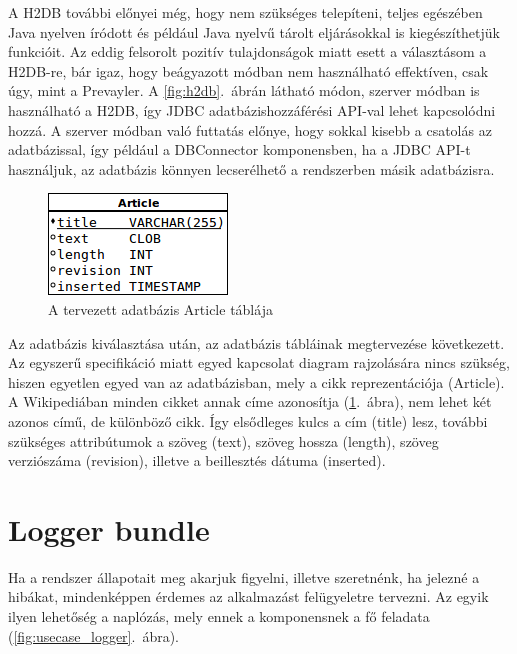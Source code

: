 \begin{enumerate}
A H2DB további előnyei még, hogy nem szükséges telepíteni, teljes egészében Java nyelven íródott és például Java nyelvű tárolt eljárásokkal is kiegészíthetjük funkcióit. Az eddig felsorolt pozitív tulajdonságok miatt esett a választásom a H2DB-re, bár igaz, hogy beágyazott módban nem használható effektíven, csak úgy, mint a Prevayler. A \ref{fig:h2db}.~ábrán látható módon, szerver módban is használható a H2DB, így JDBC adatbázishozzáférési API-val lehet kapcsolódni hozzá. A szerver módban való futtatás előnye, hogy sokkal kisebb a csatolás az adatbázissal, így például a DBConnector komponensben, ha a JDBC API-t használjuk, az adatbázis könnyen lecserélhető a rendszerben másik adatbázisra.

\end{enumerate}

\begin{figure}[htp]
\centering
\includegraphics[scale=1.0]{img/database_article}
\caption{A tervezett adatbázis Article táblája}
\label{fig:database_article}
\end{figure}

Az adatbázis kiválasztása után, az adatbázis tábláinak megtervezése következett. Az egyszerű specifikáció miatt egyed kapcsolat diagram rajzolására nincs szükség, hiszen egyetlen egyed van az adatbázisban, mely a cikk reprezentációja (Article). A Wikipediában minden cikket annak címe azonosítja (\ref{fig:database_article}.~ábra), nem lehet két azonos című, de különböző cikk. Így elsődleges kulcs a cím (title) lesz, további szükséges attribútumok a szöveg (text), szöveg hossza (length), szöveg verziószáma (revision), illetve a beillesztés dátuma (inserted).


\section{Logger bundle}
\label{sec:loggerbundle}

Ha a rendszer állapotait meg akarjuk figyelni, illetve szeretnénk, ha jelezné a hibákat, mindenképpen érdemes az alkalmazást felügyeletre tervezni. Az egyik ilyen lehetőség a naplózás, mely ennek a komponensnek a fő feladata (\ref{fig:usecase_logger}.~ábra).


